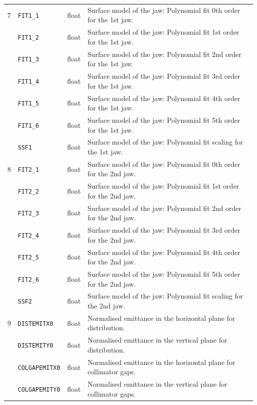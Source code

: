 \begin{center}
\begin{longtable}{| p{0.5cm} | p{2.4cm} | p{1.2cm} | >{\raggedright\arraybackslash}p{11.4cm}|}
    7   & \texttt{FIT1\_1}       & float   & Surface model of the jaw: Polynomial fit 0th order for the 1st jaw. \\
        \cline{2-4}
        & \texttt{FIT1\_2}       & float   & Surface model of the jaw: Polynomial fit 1st order for the 1st jaw. \\
        \cline{2-4}
        & \texttt{FIT1\_3}       & float   & Surface model of the jaw: Polynomial fit 2nd order for the 1st jaw. \\
        \cline{2-4}
        & \texttt{FIT1\_4}       & float   & Surface model of the jaw: Polynomial fit 3rd order for the 1st jaw. \\
        \cline{2-4}
        & \texttt{FIT1\_5}       & float   & Surface model of the jaw: Polynomial fit 4th order for the 1st jaw. \\
        \cline{2-4}
        & \texttt{FIT1\_6}       & float   & Surface model of the jaw: Polynomial fit 5th order for the 1st jaw. \\
        \cline{2-4}
        & \texttt{SSF1}          & float   & Surface model of the jaw: Polynomial fit scaling for the 1st jaw. \\
    \hline

    8   & \texttt{FIT2\_1}       & float   & Surface model of the jaw: Polynomial fit 0th order for the 2nd jaw. \\
        \cline{2-4}
        & \texttt{FIT2\_2}       & float   & Surface model of the jaw: Polynomial fit 1st order for the 2nd jaw. \\
        \cline{2-4}
        & \texttt{FIT2\_3}       & float   & Surface model of the jaw: Polynomial fit 2nd order for the 2nd jaw. \\
        \cline{2-4}
        & \texttt{FIT2\_4}       & float   & Surface model of the jaw: Polynomial fit 3rd order for the 2nd jaw. \\
        \cline{2-4}
        & \texttt{FIT2\_5}       & float   & Surface model of the jaw: Polynomial fit 4th order for the 2nd jaw. \\
        \cline{2-4}
        & \texttt{FIT2\_6}       & float   & Surface model of the jaw: Polynomial fit 5th order for the 2nd jaw. \\
        \cline{2-4}
        & \texttt{SSF2}          & float   & Surface model of the jaw: Polynomial fit scaling for the 2nd jaw. \\
    \hline

    9   & \texttt{DISTEMITX0}    & float   & Normalised emittance in the horizontal plane for distribution. \\
        \cline{2-4}
        & \texttt{DISTEMITY0}    & float   & Normalised emittance in the vertical plane for distribution. \\
        \cline{2-4}
        & \texttt{COLGAPEMITX0}  & float   & Normalised emittance in the horizontal plane for collimator gaps. \\
        \cline{2-4}
        & \texttt{COLGAPEMITY0}  & float   & Normalised emittance in the vertical plane for collimator gaps. \\
    \hline


\end{longtable}
\end{center}
